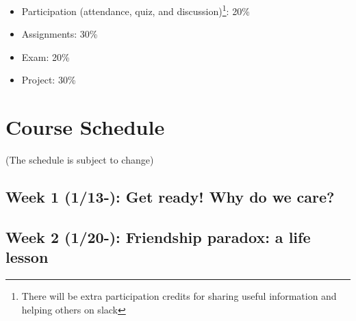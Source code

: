 \documentclass[11pt,article,oneside]{memoir} %
\begin{document}
\begin{itemize}

\item Participation (attendance, quiz, and discussion)\footnote{There will be extra participation credits for sharing useful information and helping others on slack}: 20\% 

\item Assignments: 30\%

\item Exam: 20\%

\item Project: 30\%

\end{itemize}
\clearpage
\section{Course Schedule} %

(The schedule is subject to change)

\subsection{Week 1 (1/13-):  Get ready! Why do we care?} %

\subsection{Week 2 (1/20-):  Friendship paradox: a life lesson}%
\end{document}
